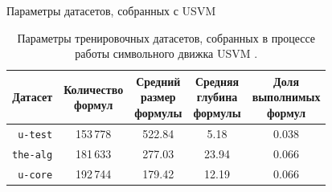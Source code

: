 \documentclass[14pt,aspectratio=169,hyperref={pdftex,unicode},xcolor=dvipsnames]{beamer}
\begin{document}
\begin{frame}[noframenumbering]{Параметры датасетов, собранных с USVM}

\begin{table}[ht]
\begin{center}
\begin{tabular}{r|cccc}
  Датасет & \makecell{Количество \\ формул} & \makecell{Средний \\ размер \\ формулы} & \makecell{Средняя \\ глубина \\ формулы} & \makecell{Доля \\ выполнимых \\ формул} \\
  \hline \hline
  \rule{0pt}{2.5ex}
  \texttt{u-test}  & 153\,778 & 522.84 &  5.18 & 0.038 \\
  \texttt{the-alg} & 181\,633 & 277.03 & 23.94 & 0.066 \\
  \texttt{u-core}  & 192\,744 & 179.42 & 12.19 & 0.066 \\
\end{tabular}
\caption{Параметры тренировочных датасетов, собранных в процессе работы символьного движка USVM \cite{usvm-github}.}
\end{center}
\end{table}

\end{frame}
\end{document}
